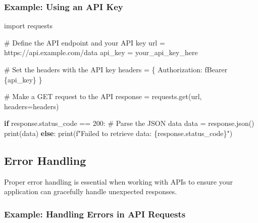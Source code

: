 \documentclass[
  letterpaper,
  DIV=11,
  numbers=noendperiod]{scrreprt}
\newenvironment{Shaded}{\begin{snugshade}}{\end{snugshade}}
\newcommand{\BuiltInTok}[1]{\textcolor[rgb]{0.00,0.23,0.31}{#1}}
\newcommand{\CommentTok}[1]{\textcolor[rgb]{0.37,0.37,0.37}{#1}}
\newcommand{\ControlFlowTok}[1]{\textcolor[rgb]{0.00,0.23,0.31}{\textbf{#1}}}
\newcommand{\DecValTok}[1]{\textcolor[rgb]{0.68,0.00,0.00}{#1}}
\newcommand{\ImportTok}[1]{\textcolor[rgb]{0.00,0.46,0.62}{#1}}
\newcommand{\NormalTok}[1]{\textcolor[rgb]{0.00,0.23,0.31}{#1}}
\newcommand{\OperatorTok}[1]{\textcolor[rgb]{0.37,0.37,0.37}{#1}}
\newcommand{\SpecialCharTok}[1]{\textcolor[rgb]{0.37,0.37,0.37}{#1}}
\newcommand{\SpecialStringTok}[1]{\textcolor[rgb]{0.13,0.47,0.30}{#1}}
\newcommand{\StringTok}[1]{\textcolor[rgb]{0.13,0.47,0.30}{#1}}
\begin{document}
\subsubsection{Example: Using an API
Key}\label{example-using-an-api-key}

\begin{Shaded}
\begin{Highlighting}[]
\ImportTok{import}\NormalTok{ requests}

\CommentTok{\# Define the API endpoint and your API key}
\NormalTok{url }\OperatorTok{=} \StringTok{\textquotesingle{}https://api.example.com/data\textquotesingle{}}
\NormalTok{api\_key }\OperatorTok{=} \StringTok{\textquotesingle{}your\_api\_key\_here\textquotesingle{}}

\CommentTok{\# Set the headers with the API key}
\NormalTok{headers }\OperatorTok{=}\NormalTok{ \{}
    \StringTok{\textquotesingle{}Authorization\textquotesingle{}}\NormalTok{: }\SpecialStringTok{f\textquotesingle{}Bearer }\SpecialCharTok{\{}\NormalTok{api\_key}\SpecialCharTok{\}}\SpecialStringTok{\textquotesingle{}}
\NormalTok{\}}

\CommentTok{\# Make a GET request to the API}
\NormalTok{response }\OperatorTok{=}\NormalTok{ requests.get(url, headers}\OperatorTok{=}\NormalTok{headers)}

\ControlFlowTok{if}\NormalTok{ response.status\_code }\OperatorTok{==} \DecValTok{200}\NormalTok{:}
    \CommentTok{\# Parse the JSON data}
\NormalTok{    data }\OperatorTok{=}\NormalTok{ response.json()}
    \BuiltInTok{print}\NormalTok{(data)}
\ControlFlowTok{else}\NormalTok{:}
    \BuiltInTok{print}\NormalTok{(}\SpecialStringTok{f"Failed to retrieve data: }\SpecialCharTok{\{}\NormalTok{response}\SpecialCharTok{.}\NormalTok{status\_code}\SpecialCharTok{\}}\SpecialStringTok{"}\NormalTok{)}
\end{Highlighting}
\end{Shaded}

\subsection{Error Handling}\label{error-handling}

Proper error handling is essential when working with APIs to ensure your
application can gracefully handle unexpected responses.

\subsubsection{Example: Handling Errors in API
Requests}\label{example-handling-errors-in-api-requests}
\end{document}
